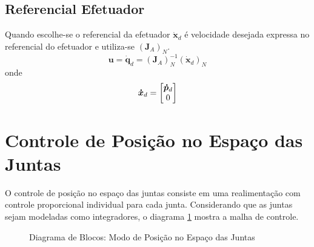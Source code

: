 \subsection{Referencial Efetuador}
Quando escolhe-se o referencial da efetuador $\bm{\dot{x}}_d$ é velocidade desejada expressa no referencial do efetuador e utiliza-se $(\bm{J}_{A})_N$.
\begin{equation}
\bm{u} = \bm{\dot{q}}_d = (\bm{J}_{A})_N^{-1} (\bm{\dot{x}}_d)_N
\end{equation}
onde 
\begin{equation}
\bm{\dot{x}}_d = \begin{bmatrix}\bm{\dot{p}}_d \\ 0\end{bmatrix}
\end{equation}

\section{Controle de Posição no Espaço das Juntas}
O controle de posição no espaço das juntas consiste em uma realimentação com controle proporcional individual para cada junta. Considerando que as juntas sejam modeladas como integradores, o diagrama \ref{fig:pos_juntas} mostra a malha de controle.

\begin{figure}[h!]
\centering
{}
\caption{Diagrama de Blocos: Modo de Posição no Espaço das Juntas}
\label{fig:pos_juntas}
\end{figure}


